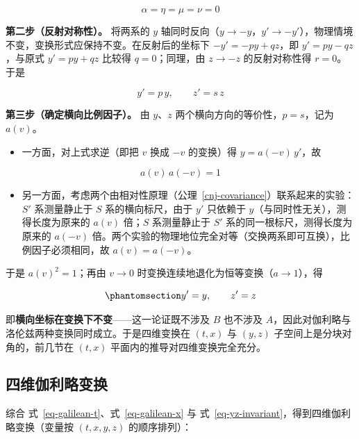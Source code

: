 \documentclass[
  chinese,
  a4paper,
  UTF8,
  12pt,
  oneside,
  openany]{ctexbook}
\providecommand{\tightlist}{%
  \setlength{\itemsep}{0pt}\setlength{\parskip}{0pt}}
\theoremstyle{plain}
\theoremstyle{plain}
\theoremstyle{plain}
\theoremstyle{definition}
\theoremstyle{plain}
\theoremstyle{plain}
\theoremstyle{remark}
\begin{document}
\[
\alpha = \eta = \mu = \nu = 0
\]

\textbf{第二步（反射对称性）。} 将两系的 \(y\)
轴同时反向（\(y \to -y\)，\(y' \to -y'\)），物理情境不变，变换形式应保持不变。在反射后的坐标下
\(-y' = -py + qz\)，即 \(y' = py - qz\)，与原式 \(y' = py + qz\) 比较得
\(q = 0\)；同理，由 \(z \to -z\) 的反射对称性得 \(r = 0\)。于是

\[
y' = p\,y, \qquad z' = s\,z
\]

\textbf{第三步（确定横向比例因子）。} 由 \(y\)、\(z\)
两个横向方向的等价性，\(p = s\)，记为 \(a(v)\)。

\begin{itemize}
\tightlist
\item
  一方面，对上式求逆（即把 \(v\) 换成 \(-v\) 的变换）得
  \(y = a(-v)\,y'\)，故
\end{itemize}

\[
a(v)\,a(-v) = 1
\]

\begin{itemize}
\tightlist
\item
  另一方面，考虑两个由相对性原理（公理~\ref{cnj-covariance}）联系起来的实验：\(S'\)
  系测量静止于 \(S\) 系的横向标尺，由于 \(y'\) 只依赖于
  \(y\)（与同时性无关），测得长度为原来的 \(a(v)\) 倍；\(S\)
  系测量静止于 \(S'\) 系的同一根标尺，测得长度为原来的 \(a(-v)\)
  倍。两个实验的物理地位完全对等（交换两系即可互换），比例因子必须相同，故
  \(a(v) = a(-v)\)。
\end{itemize}

于是 \(a(v)^{2} = 1\)；再由 \(v \to 0\)
时变换连续地退化为恒等变换（\(a \to 1\)），得

\begin{equation}\protect\phantomsection\label{eq-yz-invariant}{
y' = y, \qquad z' = z
}\end{equation}

即\textbf{横向坐标在变换下不变}------这一论证既不涉及 \(B\) 也不涉及
\(A\)，因此对伽利略与洛伦兹两种变换同时成立。于是四维变换在 \((t, x)\)
与 \((y, z)\) 子空间上是分块对角的，前几节在 \((t, x)\)
平面内的推导对四维变换完全充分。

\subsection{四维伽利略变换}\label{ux56dbux7ef4ux4f3dux5229ux7565ux53d8ux6362}

综合 式~\ref{eq-galilean-t}、式~\ref{eq-galilean-x} 与
式~\ref{eq-yz-invariant}，得到四维伽利略变换（变量按 \((t, x, y, z)\)
的顺序排列）：
\end{document}
